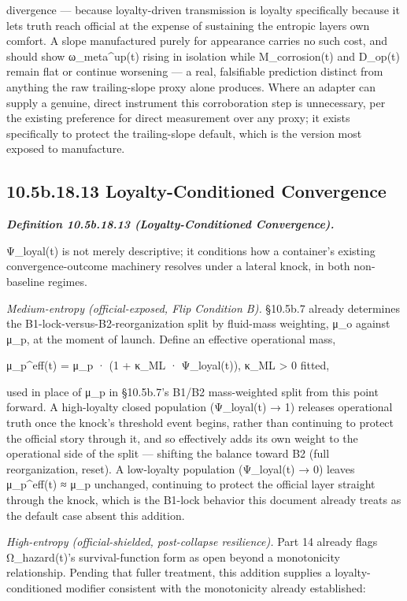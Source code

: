 \documentclass[
]{article}
\begin{document}
divergence --- because loyalty-driven transmission is loyalty
specifically because it lets truth reach official at the expense of
sustaining the entropic layers own comfort. A slope manufactured purely
for appearance carries no such cost, and should show ω\_meta\^{}up(t)
rising in isolation while M\_corrosion(t) and D\_op(t) remain flat or
continue worsening --- a real, falsifiable prediction distinct from
anything the raw trailing-slope proxy alone produces. Where an adapter
can supply a genuine, direct instrument this corroboration step is
unnecessary, per the existing preference for direct measurement over any
proxy; it exists specifically to protect the trailing-slope default,
which is the version most exposed to manufacture.

\hypertarget{b.18.13-loyalty-conditioned-convergence}{%
\subsection{10.5b.18.13 Loyalty-Conditioned
Convergence}\label{b.18.13-loyalty-conditioned-convergence}}

\emph{\textbf{Definition 10.5b.18.13 (Loyalty-Conditioned
Convergence).}}

Ψ\_loyal(t) is not merely descriptive; it conditions how a container's
existing convergence-outcome machinery resolves under a lateral knock,
in both non-baseline regimes.

\emph{Medium-entropy (official-exposed, Flip Condition B).} §10.5b.7
already determines the B1-lock-versus-B2-reorganization split by
fluid-mass weighting, μ\_o against μ\_p, at the moment of launch. Define
an effective operational mass,

μ\_p\^{}eff(t) = μ\_p · (1 + κ\_ML · Ψ\_loyal(t)), κ\_ML \textgreater{}
0 fitted,

used in place of μ\_p in §10.5b.7's B1/B2 mass-weighted split from this
point forward. A high-loyalty closed population (Ψ\_loyal(t) → 1)
releases operational truth once the knock's threshold event begins,
rather than continuing to protect the official story through it, and so
effectively adds its own weight to the operational side of the split ---
shifting the balance toward B2 (full reorganization, reset). A
low-loyalty population (Ψ\_loyal(t) → 0) leaves μ\_p\^{}eff(t) ≈ μ\_p
unchanged, continuing to protect the official layer straight through the
knock, which is the B1-lock behavior this document already treats as the
default case absent this addition.

\emph{High-entropy (official-shielded, post-collapse resilience).} Part
14 already flags Ω\_hazard(t)'s survival-function form as open beyond a
monotonicity relationship. Pending that fuller treatment, this addition
supplies a loyalty-conditioned modifier consistent with the monotonicity
already established:
\end{document}
